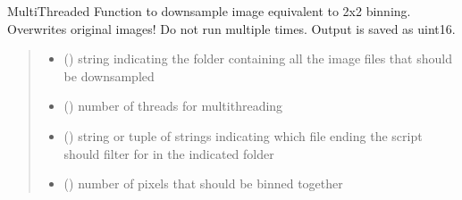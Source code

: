 \documentclass[a4paper,10pt,english,openany,oneside]{sphinxmanual}
\begin{document}
\begin{fulllineitems}
\label{\detokenize{pages/modules:sparcstools.image_processing.downsample_folder}}
\pysigstartsignatures
{}
\pysigstopsignatures
\sphinxAtStartPar
Multi\sphinxhyphen{}Threaded Function to downsample image equivalent to 2x2 binning. Overwrites original images! Do not run multiple times.
Output is saved as uint16.
\begin{quote}\begin{description}
\begin{itemize}
\item {} 
\sphinxAtStartPar
{} () \textendash{} string indicating the folder containing all the image files that should be downsampled

\item {} 
\sphinxAtStartPar
{} () \textendash{} number of threads for multithreading

\item {} 
\sphinxAtStartPar
{} (\sphinxstyleliteralemphasis{\sphinxupquote{ | }}\sphinxstyleliteralemphasis{\sphinxupquote{(}}\sphinxstyleliteralemphasis{\sphinxupquote{, }}\sphinxstyleliteralemphasis{\sphinxupquote{)}}) \textendash{} string or tuple of strings indicating which file ending the script should filter for in the indicated folder

\item {} 
\sphinxAtStartPar
{} () \textendash{} number of pixels that should be binned together

\end{itemize}

\end{description}\end{quote}

\end{fulllineitems}
\end{document}
